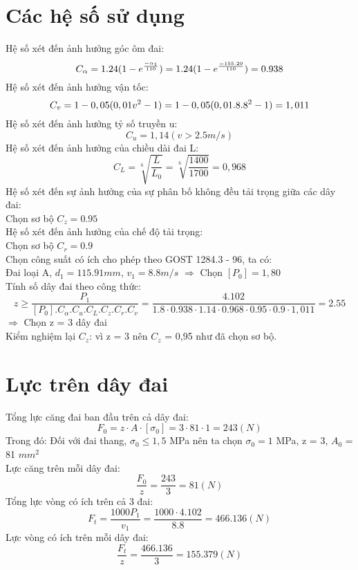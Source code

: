 \section{Các hệ số sử dụng}
Hệ số xét đến ảnh hưởng góc ôm đai: \\
\[
    C_{\alpha} = 1.24(1 - e^{\frac{-\alpha_1}{110}}) = 1.24(1 - e^{\frac{-155.29}{110}}) = 0.938 \\
\]
Hệ số xét đến ảnh hưởng vận tốc: \\
\[
    C_v = 1 - 0,05(0,01v^2 - 1) = 1 - 0,05(0,01.8.8^2 - 1) = 1,011 \\
\]
Hệ số xét đến ảnh hưởng tỷ số truyền u: \\
\[
    C_u = 1,14 (v > 2.5 m/s)
\]
Hệ số xét đến ảnh hưởng của chiều dài đai L: \\
\[
    C_L = \sqrt[6]{\frac{L}{L_0}} = \sqrt[6]{\frac{1400}{1700}} = 0,968
\]
Hệ số xét đến sự ảnh hưởng của sự phân bố không đều tải trọng giữa các dây đai: \\
Chọn sơ bộ $C_z = 0.95$ \\
Hệ số xét đến ảnh hưởng của chế độ tải trọng: \\ 
Chọn sơ bộ $C_r = 0.9$ \\   
Chọn công suất có ích cho phép theo GOST 1284.3 - 96, ta có: \\
Đai loại A, $d_1 = 115.91 mm$, $v_1 = 8.8 m/s$ 
$\Rightarrow$ Chọn $[P_0] = 1,80$ \\
Tính số dây đai theo công thức: \\
\[
    z \geq \frac{P_1}{[P_0].C_{\alpha}.C_u.C_L.C_z.C_r.C_v} = \frac{4.102}{1.8\cdot 0.938\cdot 1.14\cdot 0.968\cdot 0.95\cdot 0.9\cdot 1,011} = 2.55
\]
$\Rightarrow$ Chọn z = 3 dây đai\\
Kiểm nghiệm lại $C_z$: vì z = 3 nên $C_z$ = 0,95 như đã chọn sơ bộ.
\section{Lực trên dây đai}
Tổng lực căng đai ban đầu trên cả  dây đai: \\
\[
    F_0 = z\cdot A\cdot [\sigma_0] = 3\cdot 81\cdot 1 = 243 (N)
\]
Trong đó: Đối với đai thang, $\sigma_0 \leq 1,5$ MPa nên ta chọn $\sigma_0 = 1$ MPa, z = 3, $A_0$ = 81 $mm^2$ \\
Lực căng trên mỗi dây đai: \\
\[
    \frac{F_0}{z} = \frac{243}{3} = 81 (N)
\]
Tổng lực vòng có ích trên cả 3 đai: \\
\[
    F_t =\frac{1000P_1}{v_1} = \frac{1000\cdot 4.102}{8.8} = 466.136 (N)
\]
Lực vòng có ích trên mỗi dây đai: \\
\[
    \frac{F_t}{z} = \frac{466.136}{3} = 155.379 (N)
\]
